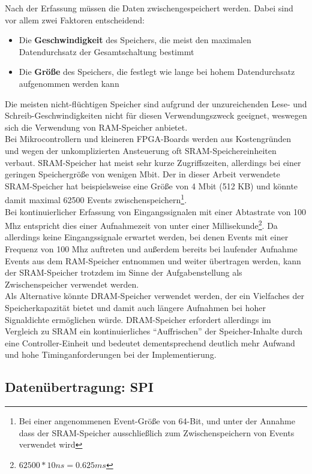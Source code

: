 Nach der Erfassung müssen die Daten zwischengespeichert werden. Dabei sind vor allem zwei Faktoren entscheidend:
\begin{itemize} 
	\item Die \textbf{Geschwindigkeit} des Speichers, die meist den maximalen Datendurchsatz der Gesamtschaltung bestimmt
	\item Die \textbf{Größe} des Speichers, die festlegt wie lange bei hohem Datendurchsatz aufgenommen werden kann 
\end{itemize}
Die meisten nicht-flüchtigen Speicher sind aufgrund der unzureichenden Lese- und Schreib-Geschwindigkeiten nicht für diesen Verwendungszweck geeignet, weswegen sich die Verwendung von \acrshort{RAM}-Speicher anbietet. \\
Bei Mikrocontrollern und kleineren FPGA-Boards werden aus Kostengründen und wegen der unkomplizierten Ansteuerung oft SRAM-Speichereinheiten verbaut. SRAM-Speicher hat meist sehr kurze Zugriffszeiten, allerdings bei einer geringen Speichergröße von wenigen Mbit. Der in dieser Arbeit verwendete SRAM-Speicher hat beispielsweise eine Größe von 4 Mbit (512 KB) und könnte damit maximal 62500 Events zwischenspeichern\footnote{Bei einer angenommenen Event-Größe von 64-Bit, und unter der Annahme dass der SRAM-Speicher ausschließlich zum Zwischenspeichern von Events verwendet wird}.\\
Bei kontinuierlicher Erfassung von Eingangssignalen mit einer Abtastrate von 100 Mhz entspricht dies einer Aufnahmezeit von unter einer Millisekunde\footnote{$62500 * 10 ns = 0.625 ms$}. Da allerdings keine Eingangssignale erwartet werden, bei denen Events mit einer Frequenz von 100 Mhz auftreten und außerdem bereits bei laufender Aufnahme Events aus dem RAM-Speicher entnommen und weiter übertragen werden, kann der SRAM-Speicher trotzdem im Sinne der Aufgabenstellung als Zwischenspeicher verwendet werden.\\
Als Alternative könnte DRAM-Speicher verwendet werden, der ein Vielfaches der Speicherkapazität bietet und damit auch längere Aufnahmen bei hoher Signaldichte ermöglichen würde. DRAM-Speicher erfordert allerdings im Vergleich zu SRAM ein kontinuierliches ``Auffrischen'' der Speicher-Inhalte durch eine Controller-Einheit und bedeutet dementsprechend deutlich mehr Aufwand und hohe Timinganforderungen bei der Implementierung.


\subsection{Datenübertragung: SPI}

